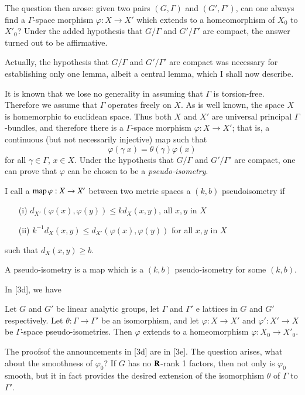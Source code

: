 The question then arose: given two pairs $(G, \Gamma)$ and $(G', \Gamma')$, can one always find a $\Gamma$-space morphism $\varphi: X \to X'$ which extends to a homeomorphism of $X_0$ to $X'_0$? Under the added hypothesis that $G/ \Gamma$ and $G'/ \Gamma'$ are compact, the answer turned out to be affirmative.

Actually, the hypothesis that $G/ \Gamma$ and $G'/\Gamma'$ are compact was necessary for establishing only one lemma, albeit a central lemma, which I shall now describe.

It is known that we lose no generality in assuming that $\Gamma$ is torsion-free. Therefore we assume that $\Gamma$ operates freely on $X$. As is well known, the space $X$ is homemorphic to euclidean space. Thus both $X$ and $X'$ are universal principal $\Gamma$-bundles, and therefore there is a $\Gamma$-space morphism $\varphi: X \to X'$; that is, a continuous (but not necessarily injective) map such that
$$
\varphi (\gamma\; x) =  \theta (\gamma) \varphi (x)
$$
for all $\gamma \in \Gamma$, $x \in X$. Under the hypothesis that $G/\Gamma$ and $G' / \Gamma'$ are compact, one can prove that $\varphi$ can be chosen to be a \textit{pseudo-isometry}.

I call a $\operatorname{map} \varphi : X \to X'$ between two metric spaces a $(k, b)$ pseudoisometry if
\begin{itemize}
\item[(i)] $d_{X'} (\varphi(x), \varphi(y)) \leqslant k d_X (x,y)$,  \hfill all $x, y$  in  $X$ 

\item[(ii)] $k^{-1} d_X (x,y) \leqslant d_{X'} (\varphi (x), \varphi (y))$ \hfill for all  $x, y$ in  $X$
\end{itemize}
 such that $d_X (x,y) \geqslant b$.

A pseudo-isometry is a map which is a $(k, b)$ pseudo-isometry for some $(k,b)$.

In [3d], we have

\begin{theorem*}
Let $G$ and $G'$ be linear analytic groups, let $\Gamma$ and $\Gamma'$ e lattices in $G$ and $G'$ respectively. Let $\theta: \Gamma \to \Gamma'$ be an isomorphism, and let $\varphi: X \to X'$ and $\varphi' : X' \to X$ be $\Gamma$-space pseudo-isometries. Then $\varphi$ extends to a homeomorphism $\varphi: X_0 \to X'_0$.
\end{theorem*}

The proofs\pageoriginale of the announcements in [3d] are in [3e]. The question arises, what about the smoothness of $\varphi_0$? If $G$ has no $\mathbf{R}$-rank 1 factors, then not only is $\varphi_0$ smooth, but it in fact provides the desired extension of the isomorphism $\theta$ of $\Gamma$ to $\Gamma'$.

